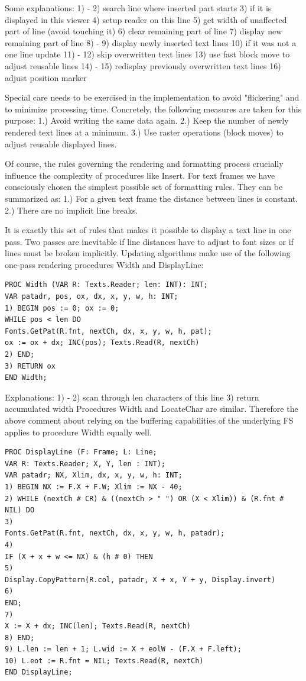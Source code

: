 Some explanations:
1) - 2) search line where inserted part starts
3) if it is displayed in this viewer
4) setup reader on this line
5) get width of unaffected part of line (avoid touching it)
6) clear remaining part of line
7) display new remaining part of line
8) - 9) display newly inserted text lines
10) if it was not a one line update
11) - 12) skip overwritten text lines
13) use fast block move to adjust reusable lines
14) - 15) redisplay previously overwritten text lines
16) adjust position marker

Special care needs to be exercised in the implementation to avoid "flickering" and to minimize
processing time. Concretely, the following measures are taken for this purpose:
1.) Avoid writing the same data again.
2.) Keep the number of newly rendered text lines at a minimum.
3.) Use raster operations (block moves) to adjust reusable displayed lines.

Of course, the rules governing the rendering and formatting process crucially influence the
complexity of procedures like Insert. For text frames we have consciously chosen the simplest
possible set of formatting rules. They can be summarized as:
1.) For a given text frame the distance between lines is constant.
2.) There are no implicit line breaks.

It is exactly this set of rules that makes it possible to display a text line in one pass. Two passes are
inevitable if line distances have to adjust to font sizes or if lines must be broken implicitly.
Updating algorithms make use of the following one-pass rendering procedures Width and
DisplayLine:
\begin{verbatim}
PROC Width (VAR R: Texts.Reader; len: INT): INT;
VAR patadr, pos, ox, dx, x, y, w, h: INT;
1) BEGIN pos := 0; ox := 0;
WHILE pos < len DO
Fonts.GetPat(R.fnt, nextCh, dx, x, y, w, h, pat);
ox := ox + dx; INC(pos); Texts.Read(R, nextCh)
2) END;
3) RETURN ox
END Width;
\end{verbatim}

Explanations:
1) - 2) scan through len characters of this line
3) return accumulated width
Procedures Width and LocateChar are similar. Therefore the above comment about relying on the
buffering capabilities of the underlying FS applies to procedure Width equally well.
\begin{verbatim}
PROC DisplayLine (F: Frame; L: Line;
VAR R: Texts.Reader; X, Y, len : INT);
VAR patadr; NX, Xlim, dx, x, y, w, h: INT;
1) BEGIN NX := F.X + F.W; Xlim := NX - 40;
2) WHILE (nextCh # CR) & ((nextCh > " ") OR (X < Xlim)) & (R.fnt # NIL) DO
3)
Fonts.GetPat(R.fnt, nextCh, dx, x, y, w, h, patadr);
4)
IF (X + x + w <= NX) & (h # 0) THEN
5)
Display.CopyPattern(R.col, patadr, X + x, Y + y, Display.invert)
6)
END;
7)
X := X + dx; INC(len); Texts.Read(R, nextCh)
8) END;
9) L.len := len + 1; L.wid := X + eolW - (F.X + F.left);
10) L.eot := R.fnt = NIL; Texts.Read(R, nextCh)
END DisplayLine;
\end{verbatim}

